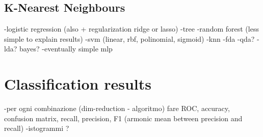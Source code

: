 \documentclass[letterpaper]{article}
\begin{document}
	\subsection{K-Nearest Neighbours}
	
	-logistic regression (also + regularization ridge or lasso)
	-tree
	-random forest (less simple to explain results)
	-svm (linear, rbf, polinomial, sigmoid)
	-knn
	-fda
	-qda?
	-lda? bayes?
	-eventually simple mlp
	
	\section{Classification results}
	-per ogni combinazione (dim-reduction - algoritmo) fare ROC, accuracy, confusion matrix, recall, precision, F1 (armonic mean between precision and recall)
	-istogrammi ? 
	
	
	
	\newpage
	\printbibliography
	\nocite{MohriRostamizadehTalwalkar18}
	\nocite{understandingml}
	
	
\end{document}
